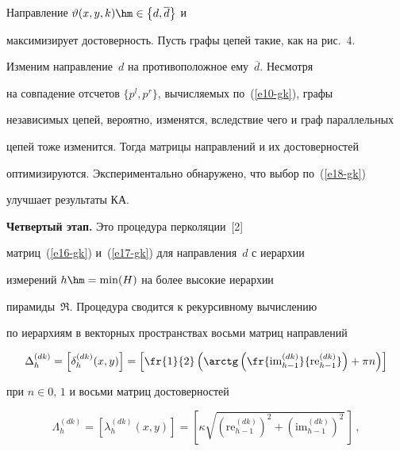   


  Направление $\vartheta(x,y,k)\hm\in \left\{d,\overline{d}\right\}$ и 


максимизирует достоверность. Пусть графы цепей такие, как на рис.~4. 


Изменим направление~$d$ на противоположное ему~$\overline{d}$. Несмотря 


на совпадение отсчетов $\{ p^l, p^r\}$, вычисляемых по~(\ref{e10-gk}), графы 


независимых цепей, вероятно, изменятся, вследствие чего и граф параллельных 


цепей тоже изменится. Тогда матрицы направлений и их достоверностей 


оптимизируются. Экспериментально обнаружено, что выбор по~(\ref{e18-gk}) 


улучшает результаты КА.


  


  \textbf{Четвертый этап.} Это процедура перколяции~[2] 


  матриц~(\ref{e16-gk}) и~(\ref{e17-gk}) для направления~$d$ с иерархии 


измерений $h\hm=\min (H)$ на более высокие иерархии 


пирамиды~$\mathfrak{R}$. Процедура сводится к рекурсивному вычислению 


по иерархиям в векторных пространствах восьми матриц направлений


  \begin{equation}


  \Delta_h^{(dk)} =\left[ \delta_h^{(dk)}(x,y)\right] = \left[ \fr{1}{2}\left( \arctg 


\left( \fr{\mathrm{im}_{h-1}^{(dk)}}{\mathrm{re}_{h-1}^{(dk)}}\right) +\pi n\right)\right]


  \label{e19-gk}


  \end{equation}


при $n\in 0,\,1$ и восьми матриц достоверностей


\begin{equation}


\Lambda_h^{(dk)} =\left[ \lambda_h^{(dk)}(x,y)\right] = \left[ \kappa 


\sqrt{(\mathrm{re}_{h-1}^{(dk)})^2+(\mathrm{im}_{h-1}^{(dk)})^2}\,\right]\,,


\label{e20-gk}


\end{equation}


